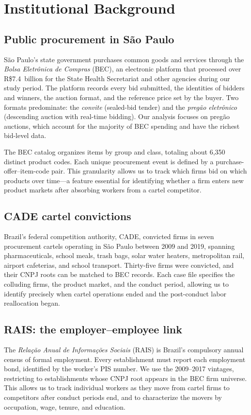 \section{Institutional Background}\label{sec:background}

\subsection{Public procurement in S\~{a}o Paulo}

S\~{a}o Paulo's state government purchases common goods and services through the \emph{Bolsa Eletr\^{o}nica de Compras} (BEC), an electronic platform that processed over R\$7.4~billion for the State Health Secretariat and other agencies during our study period. The platform records every bid submitted, the identities of bidders and winners, the auction format, and the reference price set by the buyer. Two formats predominate: the \emph{convite} (sealed-bid tender) and the \emph{preg\~{a}o eletr\^{o}nico} (descending auction with real-time bidding). Our analysis focuses on preg\~{a}o auctions, which account for the majority of BEC spending and have the richest bid-level data.

The BEC catalog organizes items by group and class, totaling about 6{,}350 distinct product codes. Each unique procurement event is defined by a purchase-offer--item-code pair. This granularity allows us to track which firms bid on which products over time---a feature essential for identifying whether a firm enters new product markets after absorbing workers from a cartel competitor.

\subsection{CADE cartel convictions}

Brazil's federal competition authority, CADE, convicted firms in seven procurement cartels operating in S\~{a}o Paulo between 2009 and 2019, spanning pharmaceuticals, school meals, trash bags, solar water heaters, metropolitan rail, airport cafeterias, and school transport. Thirty-five firms were convicted, and their CNPJ roots can be matched to BEC records. Each case file specifies the colluding firms, the product market, and the conduct period, allowing us to identify precisely when cartel operations ended and the post-conduct labor reallocation began.

\subsection{RAIS: the employer--employee link}

The \emph{Rela\c{c}\~{a}o Anual de Informa\c{c}\~{o}es Sociais} (RAIS) is Brazil's compulsory annual census of formal employment. Every establishment must report each employment bond, identified by the worker's PIS number. We use the 2009--2017 vintages, restricting to establishments whose CNPJ root appears in the BEC firm universe. This allows us to track individual workers as they move from cartel firms to competitors after conduct periods end, and to characterize the movers by occupation, wage, tenure, and education.
